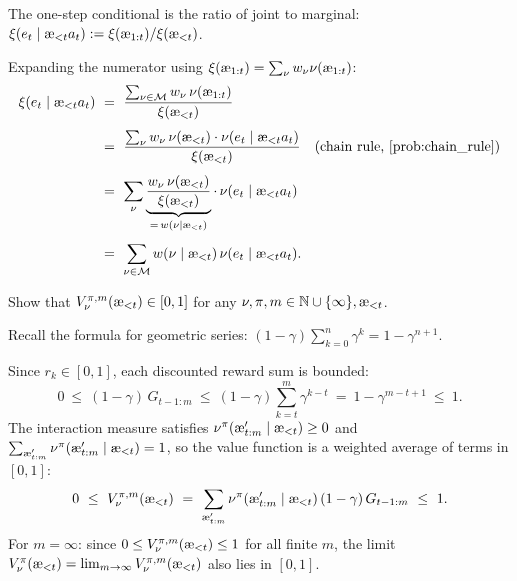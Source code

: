 \documentclass[fontsize=11pt, parskip=half]{scrartcl}
\newcommand{\cM}{\mathcal{M}}
\newcommand{\aes}{\textnormal{\ae}}
\begin{document}
\begin{solution}
The one-step conditional is the ratio of joint to marginal:
$\xi(e_t \mid \aes_{<t} a_t) := \xi(\aes_{1:t})/\xi(\aes_{<t})$.

Expanding the numerator using $\xi(\aes_{1:t}) = \sum_\nu w_\nu \nu(\aes_{1:t})$:
\begin{align*}
    \xi(e_t \mid \aes_{<t} a_t)
    ~&=~ \frac{\sum_{\nu \in \cM} w_\nu\, \nu(\aes_{1:t})}{\xi(\aes_{<t})} \\[4pt]
    ~&=~ \frac{\sum_{\nu} w_\nu\, \nu(\aes_{<t}) \cdot \nu(e_t \mid \aes_{<t} a_t)}{\xi(\aes_{<t})}
    \quad \text{(chain rule, \cref{prob:chain_rule})} \\[4pt]
    ~&=~ \sum_{\nu} \underbrace{\frac{w_\nu\, \nu(\aes_{<t})}{\xi(\aes_{<t})}}_{= \, w(\nu \mid \aes_{<t})} \cdot\, \nu(e_t \mid \aes_{<t} a_t) \\[4pt]
    ~&=~ \sum_{\nu \in \cM} w(\nu \mid \aes_{<t})\, \nu(e_t \mid \aes_{<t} a_t).
\end{align*}
\end{solution}

\begin{exercise}
\label{prob:bounded_value}
Show that $V_\nu^{\pi,m}(\aes_{<t}) \in [0,1]$ for any $\nu, \pi, m \in \mathbb{N} \cup \{\infty\}, \aes_{<t}$.


\begin{hint}
Recall the formula for geometric series: $(1-\gamma)\sum_{k=0}^{n} \gamma^k = 1 - \gamma^{n+1}$.
\end{hint}
\end{exercise}

\begin{solution}
Since $r_k \in [0,1]$, each discounted reward sum is bounded:
\[
    0 ~\leq~ (1-\gamma)\, G_{t-1:m} ~\leq~ (1-\gamma)\sum_{k=t}^{m} \gamma^{k-t} ~=~ 1 - \gamma^{m-t+1} ~\leq~ 1.
\]
The interaction measure satisfies $\nu^\pi(\aes'_{t:m} \mid \aes_{<t}) \geq 0$ and $\sum_{\aes'_{t:m}} \nu^\pi(\aes'_{t:m} \mid \aes_{<t}) = 1$, so the value function is a weighted average of terms in $[0,1]$:
\[
    0 ~\leq~ V_\nu^{\pi,m}(\aes_{<t}) ~=~ \sum_{\aes'_{t:m}} \nu^\pi(\aes'_{t:m} \mid \aes_{<t})\, (1-\gamma)\, G_{t-1:m} ~\leq~ 1.
\]
For $m = \infty$: since $0 \leq V_\nu^{\pi,m}(\aes_{<t}) \leq 1$ for all finite $m$, the limit $V_\nu^\pi(\aes_{<t}) = \lim_{m \to \infty} V_\nu^{\pi,m}(\aes_{<t})$ also lies in $[0,1]$.
\end{solution}
\end{document}
